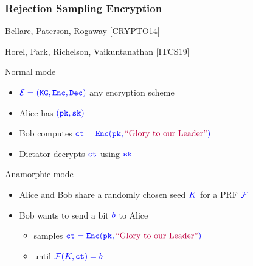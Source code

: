 \documentclass[handout]{beamer}
\begin{document}
\begin{frame}
\frametitle{Rejection Sampling Encryption}
\hfill Bellare, Paterson, Rogaway [CRYPTO14]

\hfill Horel, Park, Richelson, Vaikuntanathan [ITCS19]
\begin{block}{Normal mode}
\begin{itemize}
\item $\color{blue}\mathcal{E}=(\mathtt{KG},\mathtt{Enc},\mathtt{Dec})$ any encryption scheme
\item Alice has $\color{blue}(\mathtt{pk},\mathtt{sk})$
\item Bob computes $\color{blue}\mathtt{ct}=\mathtt{Enc}(\mathtt{pk},\text{\color{purple} ``Glory to our Leader''})$
\item Dictator decrypts $\color{blue}\mathtt{ct}$ using $\color{blue}\mathtt{sk}$
\end{itemize}
\end{block}

\pause

\begin{block}{Anamorphic mode}
\begin{itemize}
\item Alice and Bob share a randomly chosen seed $\color{blue} K$ for a PRF
$\color{blue}\mathcal{F}$
\item Bob wants to send a bit $\color{blue} b$ to Alice 

    \begin{itemize}
        \item samples $\color{blue}\mathtt{ct}=\mathtt{Enc}(\mathtt{pk},\text{\color{purple} ``Glory to our Leader''})$
        \item until $\color{blue}\mathcal{F}(K,\mathtt{ct})=b$
    \end{itemize}

\end{itemize}
\end{block}
\end{frame}

\end{document}
